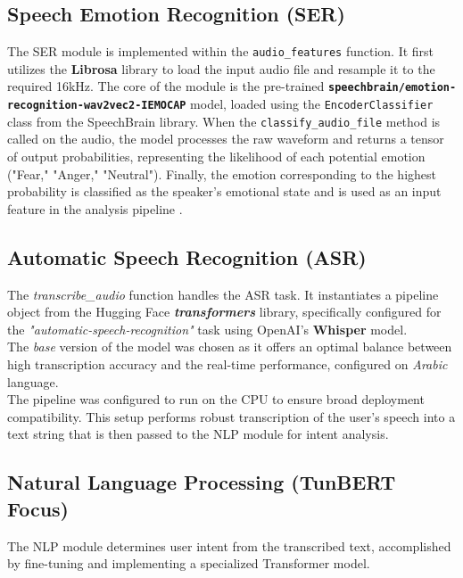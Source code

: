 \documentclass[12pt,a4paper,oneside,english]{book}
\begin{document}
{\subsection{Speech Emotion Recognition (SER)}
\label{subsec:ser_implementation}
The SER module is implemented within the \texttt{audio\_features} function. It first utilizes the \textbf{Librosa} library to load the input audio file and resample it to the required 16kHz. 
The core of the module is the pre-trained \textbf{\texttt{speechbrain/emotion-recognition-wav2vec2-IEMOCAP}} model, loaded using the \texttt{EncoderClassifier} class from the SpeechBrain library. 
 When the \texttt{classify\_audio\_file} method is called on the audio, the model processes the raw waveform and returns a tensor of output probabilities, representing the likelihood of each potential emotion ("Fear," "Anger," "Neutral").
Finally, the emotion corresponding to the highest probability is classified as the speaker's emotional state and is used as an input feature in the analysis pipeline .

\subsection{Automatic Speech Recognition (ASR)}
\label{subsec:asr_implementation}
The \textit{transcribe\_audio} function handles the ASR task. It instantiates a pipeline object from the Hugging Face \textbf{\textit{transformers}} library, specifically configured for the \textit{"automatic-speech-recognition"} task using OpenAI's \textbf{Whisper} model.
\\The \textit{base} version of the model was chosen as it offers an optimal balance between high transcription accuracy and the real-time performance, configured on \textit{Arabic} language.
\\The pipeline was configured to run on the CPU to ensure broad deployment compatibility. 
This setup performs robust transcription of the user's speech into a text string that is then passed to the NLP module for intent analysis.

\subsection{Natural Language Processing (TunBERT Focus)}
\label{sec:nlp_tunbert_implementation}
The NLP module determines user intent from the transcribed text, accomplished by fine-tuning and implementing a specialized Transformer model.

}
\end{document}

